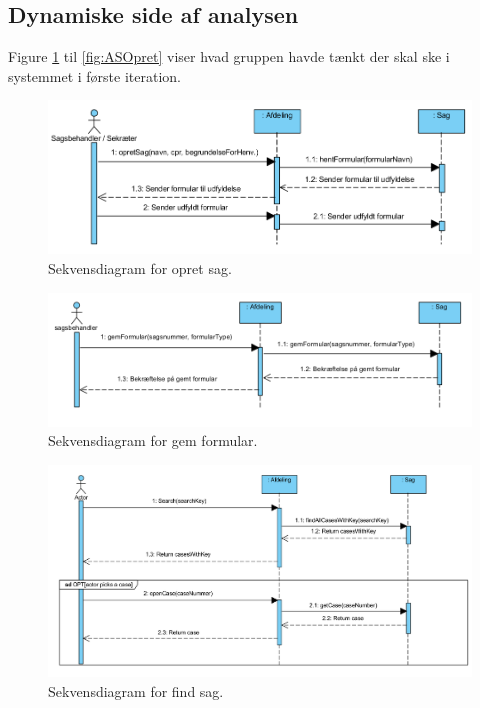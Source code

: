 \subsection{Dynamiske side af analysen}
Figure \ref{fig:OpretSag} til \ref{fig:ASOpret} viser hvad gruppen havde tænkt der skal ske i systemmet i første iteration. 


\begin{figure}
  \includegraphics[width=\linewidth]{./PNG/sekDiaOpretSag.PNG} 
  \caption{Sekvensdiagram for opret sag.}
  \label{fig:OpretSag}
\end{figure}

\begin{figure}
  \includegraphics[width=\linewidth]{./PNG/sekDiaGemFormular.PNG} 
  \caption{Sekvensdiagram for gem formular.}
  \label{fig:GemForm}
\end{figure}

\begin{figure}
  \includegraphics[width=\linewidth]{./PNG/sekDiaFindSag.PNG} 
  \caption{Sekvensdiagram for find sag.}
  \label{fig:FindSag}
\end{figure}

